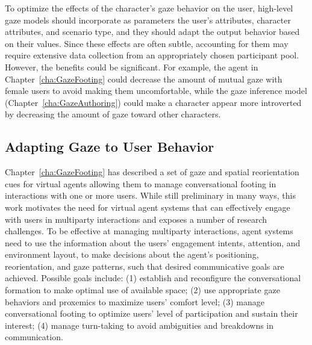 To optimize the effects of the character's gaze behavior on the user, high-level gaze models should incorporate as parameters the user's attributes, character attributes, and scenario type, and they should adapt the output behavior based on their values. Since these effects are often subtle, accounting for them may require extensive data collection from an appropriately chosen participant pool. However, the benefits could be significant. For example, the agent in Chapter~\ref{cha:GazeFooting} could decrease the amount of mutual gaze with female users to avoid making them uncomfortable, while the gaze inference model (Chapter~\ref{cha:GazeAuthoring}) could make a character appear more introverted by decreasing the amount of gaze toward other characters.

\subsection{Adapting Gaze to User Behavior}

Chapter~\ref{cha:GazeFooting} has described a set of gaze and spatial reorientation cues for virtual agents allowing them to manage conversational footing in interactions with one or more users. While still preliminary in many ways, this work motivates the need for virtual agent systems that can effectively engage with users in multiparty interactions and exposes a number of research challenges. To be effective at managing multiparty interactions, agent systems need to use the information about the users' engagement intents, attention, and environment layout, to make decisions about the agent's positioning, reorientation, and gaze patterns, such that desired communicative goals are achieved. Possible goals include: (1) establish and reconfigure the conversational formation to make optimal use of available space; (2) use appropriate gaze behaviors and proxemics to maximize users' comfort level; (3) manage conversational footing to optimize users' level of participation and sustain their interest; (4) manage turn-taking to avoid ambiguities and breakdowns in communication.

